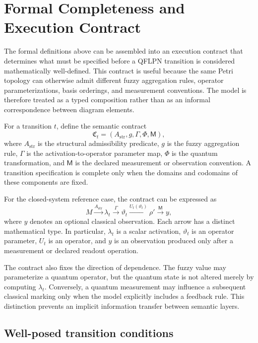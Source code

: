 \documentclass[final,3p,times]{elsarticle}
\begin{document}
\section{Formal Completeness and Execution Contract}\label{sec:contract}

The formal definitions above can be assembled into an execution contract that determines what must be specified before a QFLPN transition is considered mathematically well-defined. This contract is useful because the same Petri topology can otherwise admit different fuzzy aggregation rules, operator parameterizations, basis orderings, and measurement conventions. The model is therefore treated as a typed composition rather than as an informal correspondence between diagram elements.

For a transition $t$, define the semantic contract
\begin{equation}
    \mathfrak{C}_t=
    (A_{\mathrm{str}},g,\Gamma,\Phi,\mathsf{M}),
\end{equation}
where $A_{\mathrm{str}}$ is the structural admissibility predicate, $g$ is the fuzzy aggregation rule, $\Gamma$ is the activation-to-operator parameter map, $\Phi$ is the quantum transformation, and $\mathsf{M}$ is the declared measurement or observation convention. A transition specification is complete only when the domains and codomains of these components are fixed.

For the closed-system reference case, the contract can be expressed as
\begin{equation}
    M \xrightarrow{A_{\mathrm{str}}}
    \lambda_t
    \xrightarrow{\Gamma}
    \vartheta_t
    \xrightarrow{U_t(\vartheta_t)}
    \rho'
    \xrightarrow{\mathsf{M}}
    y,
\end{equation}
where $y$ denotes an optional classical observation. Each arrow has a distinct mathematical type. In particular, $\lambda_t$ is a scalar activation, $\vartheta_t$ is an operator parameter, $U_t$ is an operator, and $y$ is an observation produced only after a measurement or declared readout operation.

The contract also fixes the direction of dependence. The fuzzy value may parameterize a quantum operator, but the quantum state is not altered merely by computing $\lambda_t$. Conversely, a quantum measurement may influence a subsequent classical marking only when the model explicitly includes a feedback rule. This distinction prevents an implicit information transfer between semantic layers.

\subsection{Well-posed transition conditions}
\end{document}
